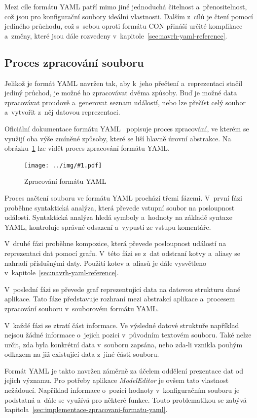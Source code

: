 \documentclass[FM,bw,DP]{tulthesis}
\newcommand{\includeimg}[2]{%
\begin{figure}[h]
	\centering
    \texttt{[image: ../img/\#1.pdf]}
    \caption{#2}
	\label{img:#1}
\end{figure}
}
\begin{document}
Mezi cíle formátu \gls{YAML} patří mimo jiné jednoduchá čitelnost a~přenositelnost, což jsou pro konfigurační soubory ideální vlastnosti. Dalším z~cílů je čtení pomocí jediného průchodu, což s~sebou oproti formátu \gls{CON} přináší určité komplikace a~změny, které jsou dále rozvedeny v~kapitole~\ref{sec:navrh-yaml-reference}.

\subsection{Proces zpracování souboru}
\label{sec:analyza-proces-zpracovani-yaml}
Jelikož je formát \gls{YAML} navržen tak, aby k~jeho přečtení a~reprezentaci stačil jediný průchod, je možné ho zpracovávat dvěma způsoby. Buď je možné data zpracovávat proudově a~generovat seznam událostí, nebo lze přečíst celý soubor a~vytvořit z~něj datovou reprezentaci.

Oficiální dokumentace formátu \gls{YAML}~\cite{bib:yaml} popisuje proces zpracování, ve kterém se využijí oba výše zmíněné způsoby, které se liší hlavně úrovní abstrakce. Na obrázku~\ref{img:yaml} lze vidět proces zpracování formátu \gls{YAML}.

\includeimg{yaml}{Zpracování formátu YAML}

Proces načtení souboru ve formátu \gls{YAML} prochází třemi fázemi. V~první fázi proběhne syntaktická analýza, která převede vstupní soubor na posloupnost událostí. Syntaktická analýza hledá symboly a~hodnoty na základě syntaxe \gls{YAML}, kontroluje správné odsazení a~vypustí ze vstupu komentáře.

V~druhé fázi proběhne kompozice, která převede posloupnost událostí na reprezentaci dat pomocí grafu. V~této fázi se z~dat odstraní kotvy a~aliasy se nahradí příslušnými daty. Použití kotev a~aliasů je dále vysvětleno v~kapitole~\ref{sec:navrh-yaml-reference}.

V~poslední fázi se převede graf reprezentující data na datovou strukturu dané aplikace. Tato fáze představuje rozhraní mezi abstrakcí aplikace a~procesem zpracování souboru v~souborovém formátu \gls{YAML}.

V~každé fázi se ztratí část informace. Ve výsledné datové struktuře například nejsou žádné informace o~jejich pozici v~původním textovém souboru. Také nelze určit, zda byla konkrétní data v~souboru zapsána, nebo zda-li vznikla pouhým odkazem na již existující data z~jiné části souboru.

Formát \gls{YAML} je takto navržen záměrně za účelem oddělení prezentace dat od jejich významu. Pro potřeby aplikace \textit{ModelEditor} je ovšem tato vlastnost nežádoucí. Například informace o~pozici hodnoty v~konfiguračním souboru je podstatná a~dále se využívá pro některé funkce. Touto problematikou se zabývá kapitola~\ref{sec:implementace-zpracovani-formatu-yaml}.
\end{document}
